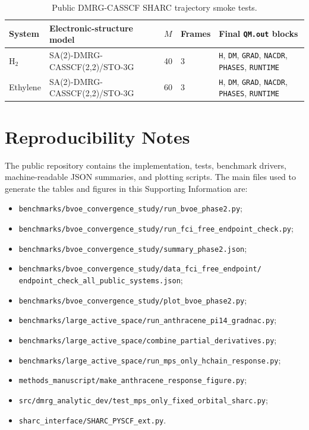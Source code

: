 \documentclass[manuscript=suppinfo]{achemso}
\begin{document}
\begin{table}[htbp]
\centering
\scriptsize
\setlength{\tabcolsep}{3pt}
\caption{Public DMRG-CASSCF SHARC trajectory smoke tests.}
\label{tab:si-sharc}
\begin{tabular}{P{0.16\textwidth}P{0.25\textwidth}P{0.08\textwidth}P{0.12\textwidth}P{0.30\textwidth}}
\toprule
System & Electronic-structure model & $M$ & Frames & Final \texttt{QM.out} blocks \\
\midrule
H$_2$ & SA(2)-DMRG-CASSCF(2,2)/STO-3G & 40 & 3 & \texttt{H}, \texttt{DM}, \texttt{GRAD}, \texttt{NACDR}, \texttt{PHASES}, \texttt{RUNTIME} \\
Ethylene & SA(2)-DMRG-CASSCF(2,2)/STO-3G & 60 & 3 & \texttt{H}, \texttt{DM}, \texttt{GRAD}, \texttt{NACDR}, \texttt{PHASES}, \texttt{RUNTIME} \\
\bottomrule
\end{tabular}
\end{table}

\section{Reproducibility Notes}

The public repository contains the implementation, tests, benchmark drivers,
machine-readable JSON summaries, and plotting scripts.  The main files used to
generate the tables and figures in this Supporting Information are:
\begin{itemize}
\small
\item \texttt{benchmarks/bvoe\_convergence\_study/run\_bvoe\_phase2.py};
\item \texttt{benchmarks/bvoe\_convergence\_study/run\_fci\_free\_endpoint\_check.py};
\item \texttt{benchmarks/bvoe\_convergence\_study/summary\_phase2.json};
\item \texttt{benchmarks/bvoe\_convergence\_study/data\_fci\_free\_endpoint/}\\
\texttt{endpoint\_check\_all\_public\_systems.json};
\item \texttt{benchmarks/bvoe\_convergence\_study/plot\_bvoe\_phase2.py};
\item \texttt{benchmarks/large\_active\_space/run\_anthracene\_pi14\_gradnac.py};
\item \texttt{benchmarks/large\_active\_space/combine\_partial\_derivatives.py};
\item \texttt{benchmarks/large\_active\_space/run\_mps\_only\_hchain\_response.py};
\item \texttt{methods\_manuscript/make\_anthracene\_response\_figure.py};
\item \texttt{src/dmrg\_analytic\_dev/test\_mps\_only\_fixed\_orbital\_sharc.py};
\item \texttt{sharc\_interface/SHARC\_PYSCF\_ext.py}.
\end{itemize}
\end{document}
